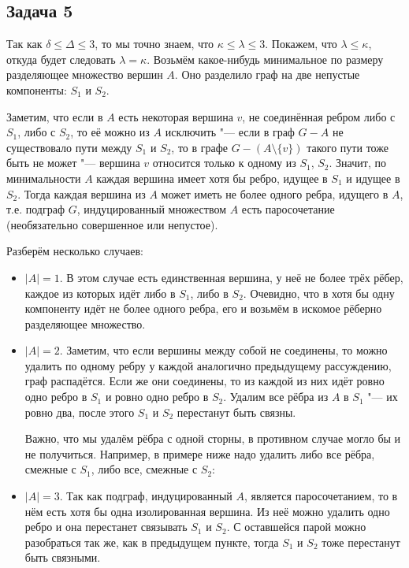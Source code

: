 \subsection{Задача 5}
	Так как $\delta \le \Delta \le 3$, то мы точно знаем, что $\kappa \le \lambda \le 3$.
	Покажем, что $\lambda \le \kappa$, откуда будет следовать $\lambda = \kappa$.
	Возьмём какое-нибудь минимальное по размеру разделяющее множество вершин $A$.
	Оно разделило граф на две непустые компоненты: $S_1$ и $S_2$.

	Заметим, что если в $A$ есть некоторая вершина $v$, не соединённая ребром либо с $S_1$, либо с $S_2$,
	то её можно из $A$ исключить "--- если в граф $G - A$ не существовало пути между $S_1$ и $S_2$,
	то в графе $G - (A \setminus \{v\})$ такого пути тоже быть не может "--- вершина $v$ относится только к одному из $S_1$, $S_2$.
	Значит, по минимальности $A$ каждая вершина имеет хотя бы ребро, идущее в $S_1$ и идущее в $S_2$.
	Тогда каждая вершина из $A$ может иметь не более одного ребра, идущего в $A$, т.е. подграф $G$, индуцированный множеством $A$
	есть паросочетание (необязательно совершенное или непустое).

	Разберём несколько случаев:
	\begin{itemize}
		\item
			$|A|=1$.
			В этом случае есть единственная вершина, у неё не более трёх рёбер, каждое из которых идёт либо в $S_1$, либо в $S_2$.
			Очевидно, что в хотя бы одну компоненту идёт не более одного ребра, его и возьмём в искомое рёберно разделяющее множество.
		\item
			$|A|=2$.
			Заметим, что если вершины между собой не соединены, то можно удалить по одному ребру у каждой аналогично предыдущему рассуждению, граф распадётся.
			Если же они соединены, то из каждой из них идёт ровно одно ребро в $S_1$ и ровно одно ребро в $S_2$.
			Удалим все рёбра из $A$ в $S_1$ "--- их ровно два, после этого $S_1$ и $S_2$ перестанут быть связны.
			\begin{Rem}
				Важно, что мы удалём рёбра с одной сторны, в противном случае могло бы и не получиться.
				Например, в примере ниже надо удалить либо все рёбра, смежные с $S_1$, либо все, смежные с $S_2$:
				\begin{center}
				\end{center}
			\end{Rem}
		\item
			$|A|=3$.
			Так как подграф, индуцированный $A$, является паросочетанием, то в нём есть хотя бы одна изолированная вершина.
			Из неё можно удалить одно ребро и она перестанет связывать $S_1$ и $S_2$.
			С оставшейся парой можно разобраться так же, как в предыдущем пункте, тогда $S_1$ и $S_2$ тоже перестанут быть связными.
	\end{itemize}
	
